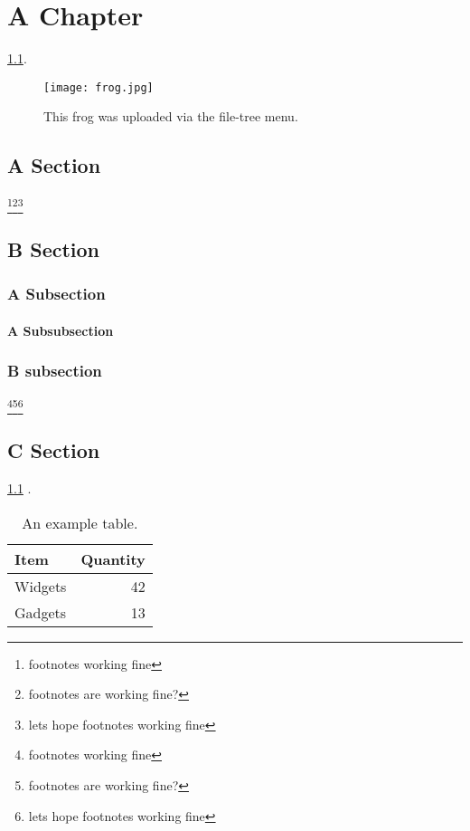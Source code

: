 \chapter{A Chapter}

\lipsum[1] \ref{fig:frog}.

\begin{figure}
    \centering
    \caption{\label{fig:frog}This frog was uploaded via the file-tree menu.}
    \texttt{[image: frog.jpg]}
\end{figure}

\section{A Section}

\lipsum[2]\footnote{footnotes working fine}\footnote{footnotes are working fine?}\footnote{lets hope footnotes working fine}

\section{B Section}

\subsection{A Subsection}
\lipsum[3]
\subsubsection{A Subsubsection}
\lipsum[4]
\subsection{B subsection}
\lipsum[5]\footnote{footnotes working fine}\footnote{footnotes are working fine?}\footnote{lets hope footnotes working fine}

\section{C Section}
\lipsum[6-8] \ref{tab:widgets} \cite{One, Two, Three}.

\begin{table}
    \centering
    \caption{\label{tab:widgets}An example table.}
    \begin{tabular}{l|r}
        Item & Quantity \\\hline
        Widgets & 42 \\
        Gadgets & 13
    \end{tabular}
\end{table}